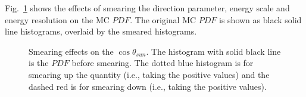 Fig.~\ref{smearESpdfs} shows the effects of smearing the direction parameter, energy scale and energy resolution on the MC $PDF$. The original MC $PDF$ is shown as black solid line histograms, overlaid by the smeared histograms.

\begin{figure}[htbp]
	\centering
	\caption[Smearing effects on the $\cos\theta_{sun}$ $PDF$.]{Smearing effects on the $\cos\theta_{sun}$. The histogram with solid black line is the $PDF$ before smearing. The dotted blue histogram is for smearing up the quantity (i.e., taking the positive values) and the dashed red is for smearing down (i.e., taking the positive values).\label{smearESpdfs}}
\end{figure}   

